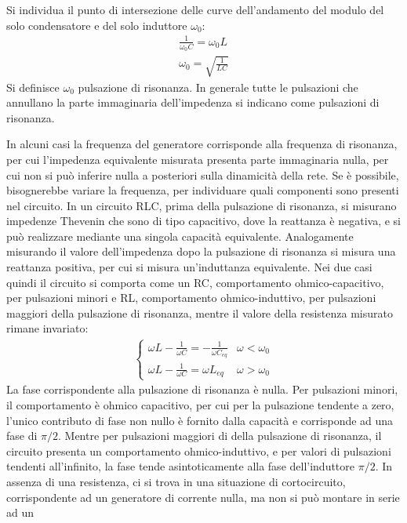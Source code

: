 \documentclass{article}
\numberwithin{equation}{subsection}
\begin{document}
Si individua il punto di intersezione delle curve dell'andamento del modulo del solo condensatore e del solo induttore $\omega_0$:
\begin{gather*}
    \displaystyle\frac{1}{\omega_0C}=\omega_0L\\
    \omega_0=\displaystyle\sqrt{\frac{1}{LC}}
\end{gather*}
Si definisce $\omega_0$ pulsazione di risonanza. In generale tutte le pulsazioni che annullano la parte immaginaria dell'impedenza si indicano come pulsazioni di risonanza. 

In alcuni casi la frequenza del generatore corrisponde alla frequenza di risonanza, per cui l'impedenza equivalente misurata presenta parte immaginaria nulla, per cui non 
si può inferire nulla a posteriori sulla dinamicità della rete. Se è possibile, bisognerebbe variare la frequenza, per individuare quali componenti sono presenti nel circuito. 
In un circuito RLC, prima della pulsazione di risonanza, si misurano impedenze Thevenin che sono di tipo capacitivo, dove la reattanza è negativa, e si può realizzare mediante 
una singola capacità equivalente. Analogamente misurando 
il valore dell'impedenza dopo la pulsazione di risonanza si misura una reattanza positiva, per cui si misura un'induttanza equivalente. Nei due casi quindi il circuito 
si comporta come un RC, comportamento ohmico-capacitivo, per pulsazioni minori e RL, comportamento ohmico-induttivo, per pulsazioni maggiori della pulsazione di risonanza, 
mentre il valore della resistenza misurato rimane invariato: 
\begin{gather*}
    \begin{cases}
        \omega L-\displaystyle\frac{1}{\omega C}=-\frac{1}{\omega C_{eq}}&\omega<\omega_0\\
        \omega L-\displaystyle\frac{1}{\omega C}=\omega L_{eq}&\omega>\omega_0
    \end{cases}
\end{gather*}
La fase corrispondente alla pulsazione di risonanza è nulla. Per pulsazioni minori, il comportamento è ohmico capacitivo, per cui per la pulsazione tendente a zero, 
l'unico contributo di fase non nullo è fornito dalla capacità e corrisponde ad una fase di $\pi/2$. Mentre per pulsazioni maggiori di della pulsazione di risonanza, 
il circuito presenta un comportamento ohmico-induttivo, e per valori di pulsazioni tendenti all'infinito, la fase tende asintoticamente alla fase dell'induttore $\pi/2$. 
In assenza di una resistenza, ci si trova in una situazione di cortocircuito, corrispondente ad un generatore di corrente nulla, ma non si può montare in serie ad un 
\end{document}
